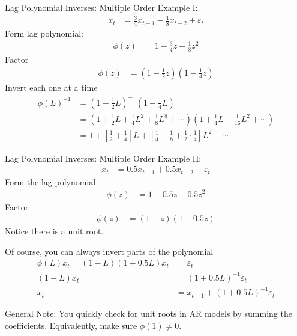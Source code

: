 \documentclass[handout]{beamer}
\begin{document}
\begin{frame}[shrink]{Lag Polynomial Inverses: Multiple Order}
Example I:
\begin{align*}
  x_t
  &=
  \frac{3}{4}x_{t-1} - \frac{1}{8}x_{t-2}
  +
  \varepsilon_t
\end{align*}
\pause
Form lag polynomial:
\begin{align*}
  \phi(z)
  &=
  1 - \frac{3}{4}z + \frac{1}{8}z^2
\end{align*}
\pause
Factor
\begin{align*}
  \phi(z)
  &=
  \left(
    1-\frac{1}{2}z
  \right)
  \left(
    1-\frac{1}{4}z
  \right)
\end{align*}
\pause
Invert each one at a time
\begin{align*}
  \phi(L)^{-1}
  &=
  \left(
    1-\frac{1}{2}L
  \right)^{-1}
  \left(
    1-\frac{1}{4}L
  \right)
  \\
  &=
  \left(
    1
    +\frac{1}{2}L
    +\frac{1}{4}L^2
    +\frac{1}{8}L^8
    +\cdots
  \right)
  \left(
    1
    +\frac{1}{4}L
    +\frac{1}{16}L^2
    +\cdots
  \right)
  \\
  &=
  1
  +
  \left[
    \frac{1}{2}
    +
    \frac{1}{4}
  \right]
  L
  +
  \left[
    \frac{1}{4}
    +
    \frac{1}{8}
    +
    \frac{1}{2}
    \cdot
    \frac{1}{4}
  \right]
  L^2
  +
  \cdots
\end{align*}
\end{frame}



\begin{frame}[shrink]{Lag Polynomial Inverses: Multiple Order}
Example II:
\begin{align*}
  x_t
  &= 0.5x_{t-1} + 0.5x_{t-2} + \varepsilon_t
\end{align*}
Form the lag polynomial
\begin{align*}
  \phi(z)
  &= 1 - 0.5z -0.5z^2
\end{align*}
\pause
Factor
\begin{align*}
  \phi(z)
  &= (1-z)(1+0.5z)
\end{align*}
Notice there is a unit root.

\pause
Of course, you can always invert parts of the polynomial
\begin{align*}
  \phi(L)x_t
  =
  (1-L)(1+0.5L)
  x_t
  &=
  \varepsilon_t
  \\
  (1-L)x_t &= (1+0.5L)^{-1}\varepsilon_t
  \\
  x_t &= x_{t-1} + (1+0.5L)^{-1}\varepsilon_t
\end{align*}


\pause
\alert{General Note}:
You quickly check for unit roots in AR models by summing the
coefficients. Equivalently, make sure $\phi(1)\neq 0$.
\end{frame}
\end{document}
